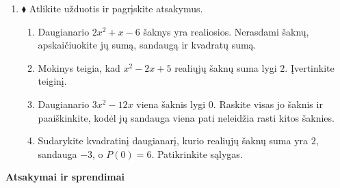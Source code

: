 \documentclass[12pt,a4paper]{article}
\begin{document}
\begin{enumerate}[resume=uzdaviniai]
\item $\blacklozenge$ Atlikite užduotis ir pagrįskite atsakymus.
\begin{enumerate}
\item Daugianario $2x^2+x-6$ šaknys yra realiosios. Nerasdami šaknų, apskaičiuokite jų sumą, sandaugą ir kvadratų sumą.
\item Mokinys teigia, kad $x^2-2x+5$ realiųjų šaknų suma lygi $2$. Įvertinkite teiginį.
\item Daugianario $3x^2-12x$ viena šaknis lygi $0$. Raskite visas jo šaknis ir paaiškinkite, kodėl jų sandauga viena pati neleidžia rasti kitos šaknies.
\item Sudarykite kvadratinį daugianarį, kurio realiųjų šaknų suma yra $2$, sandauga $-3$, o $P(0)=6$. Patikrinkite sąlygas.
\end{enumerate}
\end{enumerate}
\newpage
\begin{center}{\Large\bfseries Atsakymai ir sprendimai}\end{center}
\end{document}
